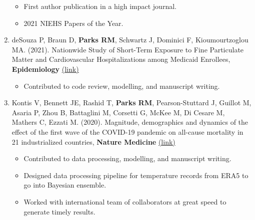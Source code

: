 \begin{enumerate}
    \begin{itemize}
        \item First author publication in a high impact journal.
        \item 2021 NIEHS Papers of the Year. 
    \end{itemize}

    \item deSouza P, Braun D, \textbf{Parks RM}, Schwartz J, Dominici F, Kioumourtzoglou MA. (2021). Nationwide Study of Short-Term Exposure to Fine Particulate Matter and Cardiovascular Hospitalizations among Medicaid Enrollees, \textbf{Epidemiology} \href{https://journals.lww.com/epidem/Abstract/2021/01000/Nationwide_Study_of_Short_term_Exposure_to_Fine.2.aspx}{(link)}

    \begin{itemize}
        \item Contributed to code review, modelling, and manuscript writing.
    \end{itemize}


     \item Kontis V, Bennett JE, Rashid T, \textbf{Parks RM}, Pearson-Stuttard J, Guillot M, Asaria P, Zhou B, Battaglini M, Corsetti G, McKee M, Di Cesare M, Mathers C, Ezzati M. (2020). Magnitude, demographics and dynamics of the effect of the first wave of the COVID-19 pandemic on all-cause mortality in 21 industrialized countries, \textbf{Nature Medicine} \href{https://doi.org/10.1038/s41591-020-1112-0}{(link)}

    \begin{itemize}
        \item Contributed to data processing, modelling, and manuscript writing.
        \item Designed data processing pipeline for temperature records from ERA5 to go into Bayesian ensemble.
        \item Worked with international team of collaborators at great speed to generate timely results.
    \end{itemize}


\end{enumerate}
